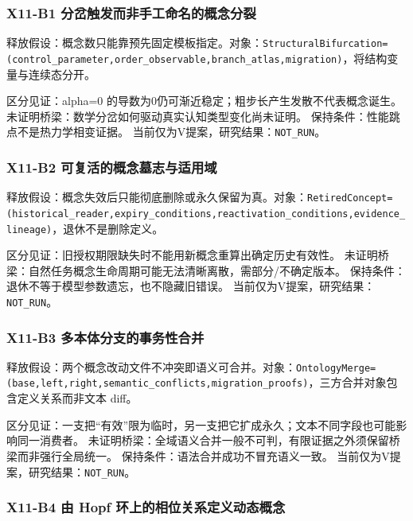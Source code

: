 \documentclass[
  10pt,
]{article}
\begin{document}
\subsubsection{X11-B1
分岔触发而非手工命名的概念分裂}\label{x11-b1-ux5206ux5c94ux89e6ux53d1ux800cux975eux624bux5de5ux547dux540dux7684ux6982ux5ff5ux5206ux88c2}

释放假设：概念数只能靠预先固定模板指定。对象：\nolinkurl{StructuralBifurcation=(control_parameter,order_observable,branch_atlas,migration)}，将结构变量与连续态分开。

区分见证：alpha=0 的导数为0仍可渐近稳定；粗步长产生发散不代表概念诞生。
未证明桥梁：数学分岔如何驱动真实认知类型变化尚未证明。
保持条件：性能跳点不是热力学相变证据。
当前仅为V提案，研究结果：\nolinkurl{NOT_RUN}。

\subsubsection{X11-B2
可复活的概念墓志与适用域}\label{x11-b2-ux53efux590dux6d3bux7684ux6982ux5ff5ux5893ux5fd7ux4e0eux9002ux7528ux57df}

释放假设：概念失效后只能彻底删除或永久保留为真。对象：\nolinkurl{RetiredConcept=(historical_reader,expiry_conditions,reactivation_conditions,evidence_lineage)}，退休不是删除定义。

区分见证：旧授权期限缺失时不能用新概念重算出确定历史有效性。
未证明桥梁：自然任务概念生命周期可能无法清晰离散，需部分/不确定版本。
保持条件：退休不等于模型参数遗忘，也不隐藏旧错误。
当前仅为V提案，研究结果：\nolinkurl{NOT_RUN}。

\subsubsection{X11-B3
多本体分支的事务性合并}\label{x11-b3-ux591aux672cux4f53ux5206ux652fux7684ux4e8bux52a1ux6027ux5408ux5e76}

释放假设：两个概念改动文件不冲突即语义可合并。对象：\nolinkurl{OntologyMerge=(base,left,right,semantic_conflicts,migration_proofs)}，三方合并对象包含定义关系而非文本
diff。

区分见证：一支把``有效''限为临时，另一支把它扩成永久；文本不同字段也可能影响同一消费者。
未证明桥梁：全域语义合并一般不可判，有限证据之外须保留桥梁而非强行全局统一。
保持条件：语法合并成功不冒充语义一致。
当前仅为V提案，研究结果：\nolinkurl{NOT_RUN}。

\subsubsection{X11-B4 由 Hopf
环上的相位关系定义动态概念}\label{x11-b4-ux7531-hopf-ux73afux4e0aux7684ux76f8ux4f4dux5173ux7cfbux5b9aux4e49ux52a8ux6001ux6982ux5ff5}
\end{document}
